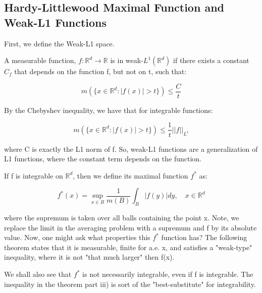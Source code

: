 \documentclass[class=article, crop=false]{standalone}
\begin{document}
		\subsection{Hardy-Littlewood Maximal Function and Weak-L1 Functions}
			First, we define the Weak-L1 space. 

			\begin{definition}
				A measurable function, $f : \mathbb{R}^d \rightarrow \mathbb{R}$ is in weak-$L^1(\mathbb{R}^d)$ if there exists a constant $C_f$ that depends on the function f, but not on t, such that:

					$$m(\{x \in \mathbb{R}^d : |f(x)| > t\}) \le \frac{C}{t}$$
			\end{definition}

			By the Chebyshev inequality, we have that for integrable functions:

				$$m(\{x \in \mathbb{R}^d : |f(x)| > t\}) \le \frac{1}{t}||f||_{L^1}$$

			where C is exactly the L1 norm of f. So, weak-L1 functions are a generalization of L1 functions, where the constant term depends on the function.

			If f is integrable on $\mathbb{R}^d$, then we define its maximal function $f^*$ as:

				$$f^*(x) = \sup_{x \in B} \frac{1}{m(B)} \int_B |f(y)| dy, \quad x \in \mathbb{R}^d$$

			where the supremum is taken over all balls containing the point x. Note, we replace the limit in the averaging problem with a supremum and f by its absolute value. Now, one might ask what properties this $f^*$ function has? The following theorem states that it is measurable, finite for a.e. x, and satisfies a "weak-type" inequality, where it is not "that much larger" then f(x).

			We shall also see that $f^*$ is not necessarily integrable, even if f is integrable. The inequality in the theorem part iii) is sort of the "best-substitute" for integrability.
\end{document}

